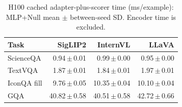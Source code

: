 \begin{table}[t]
\centering\small
\setlength{\tabcolsep}{3pt}\renewcommand{\arraystretch}{1.10}
\caption{H100 cached adapter-plus-scorer time (ms/example): MLP+Null mean $\pm$ between-seed SD. Encoder time is excluded.}
\label{tab:latency-main}
\begin{tabular}{@{}lrrr@{}}
\toprule
Task & SigLIP2 & InternVL & LLaVA \\
\midrule
ScienceQA & 0.94\,$\pm$\,0.01 & 0.99\,$\pm$\,0.00 & 0.95\,$\pm$\,0.00 \\
TextVQA & 1.87\,$\pm$\,0.01 & 1.84\,$\pm$\,0.01 & 1.97\,$\pm$\,0.01 \\
IconQA fill & 9.76\,$\pm$\,0.05 & 10.35\,$\pm$\,0.04 & 10.10\,$\pm$\,0.04 \\
GQA & 40.82\,$\pm$\,0.58 & 40.51\,$\pm$\,0.58 & 42.72\,$\pm$\,0.66 \\
\bottomrule
\end{tabular}
\end{table}
